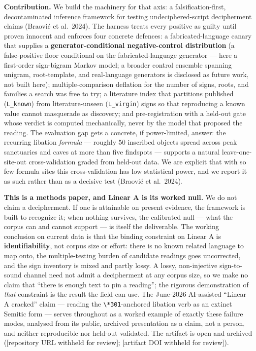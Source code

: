 \documentclass[
  10pt,
]{article}
\begin{document}
\textbf{Contribution.} We build the machinery for that axis: a
falsification-first, decontaminated inference framework for testing
undeciphered-script decipherment claims (Braović et al.~2024). The
harness treats every positive as guilty until proven innocent and
enforces four concrete defences: a fabricated-language canary that
supplies a \textbf{generator-conditional negative-control distribution}
(a false-positive floor conditional on the fabricated-language generator
--- here a first-order sign-bigram Markov model; a broader control
ensemble spanning unigram, root-template, and real-language generators
is disclosed as future work, not built here); multiple-comparison
deflation for the number of signs, roots, and families a search was free
to try; a literature index that partitions published (\texttt{L\_known})
from literature-unseen (\texttt{L\_virgin}) signs so that reproducing a
known value cannot masquerade as discovery; and pre-registration with a
held-out gate whose verdict is computed mechanically, never by the model
that proposed the reading. The evaluation gap gets a concrete, if
power-limited, answer: the recurring libation \emph{formula} --- roughly
50 inscribed objects spread across peak sanctuaries and caves at more
than five findspots --- supports a natural leave-one-site-out
cross-validation graded from held-out data. We are explicit that with so
few formula sites this cross-validation has low statistical power, and
we report it as such rather than as a decisive test (Braović et
al.~2024).

\textbf{This is a methods paper, and Linear A is its worked null.} We do
not claim a decipherment. If one is attainable on present evidence, the
framework is built to recognize it; when nothing survives, the
calibrated null --- what the corpus can and cannot support --- is itself
the deliverable. The working conclusion on current data is that the
binding constraint on Linear A is \textbf{identifiability}, not corpus
size or effort: there is no known related language to map onto, the
multiple-testing burden of candidate readings goes uncorrected, and the
sign inventory is mixed and partly lossy. A lossy, non-injective
sign-to-sound channel need not admit a decipherment at any corpus size,
so we make no claim that ``there is enough text to pin a reading''; the
rigorous demonstration of \emph{that} constraint is the result the field
can use. The June-2026 AI-assisted ``Linear A cracked'' claim ---
reading the \texttt{\textbackslash{}*301}-anchored libation verb as an
extinct Semitic form --- serves throughout as a worked example of
exactly these failure modes, analysed from its public, archived
presentation as a claim, not a person, and neither reproducible nor
held-out validated. The artifact is open and archived ({[}repository URL
withheld for review{]}; {[}artifact DOI withheld for review{]}).
\end{document}
